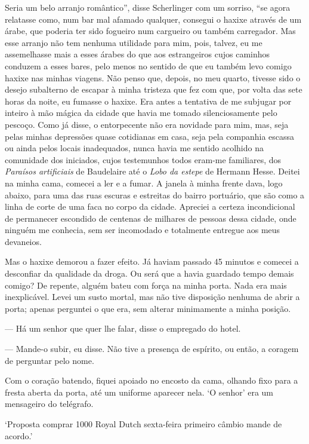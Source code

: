 Seria um belo arranjo romântico'', disse Scherlinger com um sorriso,
``se agora relatasse como, num bar mal afamado qualquer, consegui o
haxixe através de um árabe, que poderia ter sido fogueiro num cargueiro
ou também carregador. Mas esse arranjo não tem nenhuma utilidade para
mim, pois, talvez, eu me assemelhasse mais a esses árabes do que aos
estrangeiros cujos caminhos conduzem a esses bares, pelo menos no
sentido de que eu também levo comigo haxixe nas minhas viagens. Não
penso que, depois, no meu quarto, tivesse sido o desejo subalterno de
escapar à minha tristeza que fez com que, por volta das sete horas da
noite, eu fumasse o haxixe. Era antes a tentativa de me subjugar por
inteiro à mão mágica da cidade que havia me tomado silenciosamente pelo
pescoço. Como já disse, o entorpecente não era novidade para mim, mas,
seja pelas minhas depressões quase cotidianas em casa, seja pela companhia
escassa ou ainda pelos locais inadequados, nunca havia me sentido acolhido
na comunidade dos iniciados, cujos testemunhos todos eram-me familiares,
dos \emph{Paraísos artificiais} de Baudelaire até o \emph{Lobo da
estepe} de Hermann Hesse. Deitei na minha cama, comecei a ler e a fumar.
A janela à minha frente dava, logo abaixo, para uma das ruas escuras e
estreitas do bairro portuário, que são como a linha de corte de uma faca
no corpo da cidade. Apreciei a certeza incondicional de permanecer
escondido de centenas de milhares de pessoas dessa cidade, onde ninguém
me conhecia, sem ser incomodado e totalmente entregue aos meus
devaneios.

Mas o haxixe demorou a fazer efeito. Já haviam passado 45 minutos e
comecei a desconfiar da qualidade da droga. Ou será que a havia guardado
tempo demais comigo? De repente, alguém bateu com força na minha porta.
Nada era mais inexplicável. Levei um susto mortal, mas não tive
disposição nenhuma de abrir a porta; apenas perguntei o que era, sem
alterar minimamente a minha posição.

--- Há um senhor que quer lhe falar, disse o empregado do hotel.

--- Mande-o subir, eu disse. Não tive a presença de espírito, ou então, a
coragem de perguntar pelo nome.

Com o coração batendo, fiquei apoiado no encosto da cama, olhando fixo
para a fresta aberta da porta, até um uniforme aparecer nela. `O senhor'
era um mensageiro do telégrafo.

`Proposta comprar 1000 Royal Dutch sexta-feira primeiro câmbio mande
de acordo.'

